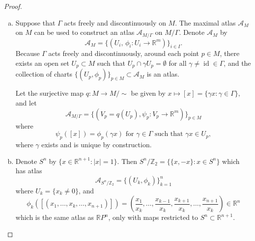 \documentclass{article}
\begin{document}
\begin{proof} \text{} \\
  \begin{enumerate}[(a)]
    \item
      Suppose that $\Gamma$ acts freely and discontinuously on $M$. The
      maximal atlas $\mathcal{A}_M$ on $M$ can be used to construct an atlas
      $\mathcal{A}_{M/\Gamma}$ on $M/\Gamma$. Denote $\mathcal{A}_M$ by \[
        \mathcal{A}_M =
        \{(U_i,\, \phi_i\colon U_i \rightarrow \mathbb{R}^m)\}_{i \in I}.
      \]
      Because $\Gamma$ acts freely and discontinuously, around each point
      $p \in M$, there exists an open set $U_p \subset M$ such that
      $U_p \cap \gamma U_p = \emptyset$ for all
      $\gamma \not= \operatorname{id} \in \Gamma$, and the collection of charts
      $\{(U_p, \phi_p)\}_{p \in M} \subset \mathcal{A}_M$ is an atlas.

      Let the surjective map $q\colon M \rightarrow M/\sim$ be given by $
        x \mapsto [x] = \{\gamma x : \gamma\in\Gamma\},
      $ and let \[
        \mathcal{A}_{M/\Gamma} = \{(
          V_p = q(U_p),
          \psi_p\colon V_p\rightarrow\mathbb{R}^m)
        \}_{p \in M}
      \] where \[
        \psi_p([x]) = \phi_p(\gamma x)
        \text { for } \gamma\in\Gamma \text { such that } \gamma x \in U_p,
      \] where $\gamma$ exists and is unique by construction.
    \item
      Denote $S^n$ by $\{ x \in \mathbb{R}^{n+1} : |x| = 1 \}$.
      Then $S^n/\mathbb{Z}_2 = \{ \{ x, -x \} : x\in S^n\}$ which has atlas \[
        \mathcal{A}_{S^n/\mathbb{Z}_2} = \{(U_k, \phi_k)\}_{k=1}^n
      \] where $U_k = \{x_k \not= 0\}$, and \[
        \phi_k([(x_1, \hdots, x_k, \hdots, x_{n+1})])
        = \left(\frac{x_1}{x_k}, \hdots,
        \frac{x_{k-1}}{x_k}, \frac{x_{k+1}}{x_k},
        \hdots, \frac{x_{n+1}}{x_k}\right) \in \mathbb{R}^n
      \] which is the same atlas as $\mathbb{R}P^n$, only with maps restricted
      to $S^n \subset \mathbb{R}^{n+1}$.
  \end{enumerate}
\end{proof}
\end{document}
